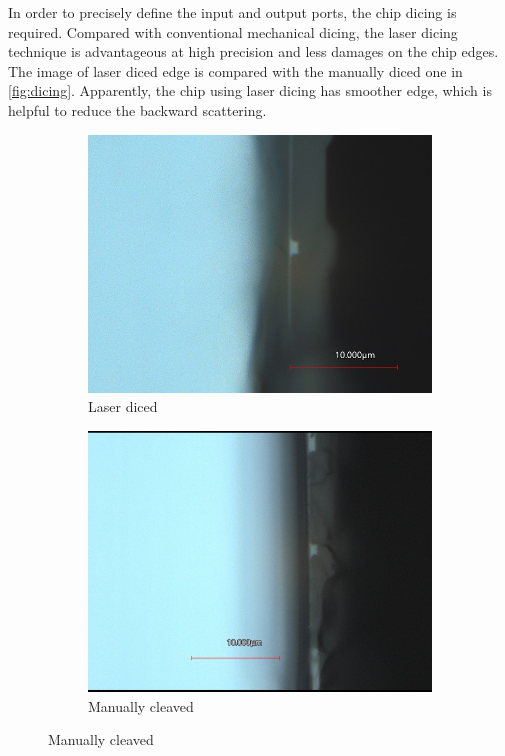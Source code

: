 In order to precisely define the input and output ports, the chip dicing is required.
Compared with conventional mechanical dicing,  the laser dicing technique is advantageous at high precision and less damages on the chip edges. The image of laser diced edge is compared with the manually diced one in \autoref{fig:dicing}. Apparently, the chip using laser dicing has smoother edge, which is helpful to reduce the backward scattering.

\begin{figure}
    \centering
	\begin{subfigure}[b]{0.45\textwidth}
		\includegraphics[width=\textwidth]{imgs/jpg/laser}
 		\caption{Laser diced}
	\end{subfigure}
	\begin{subfigure}[b]{0.45\textwidth}
		\includegraphics[width=\textwidth]{imgs/jpg/manual_cleav}
 		\caption{Manually cleaved}
	\end{subfigure}
    \label{fig:dicing}
\end{figure}

